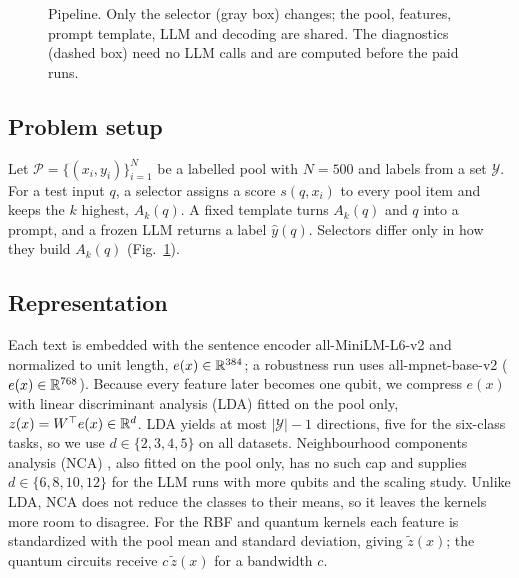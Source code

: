 \begin{figure}[t]
\centering
\resizebox{\textwidth}{!}{}
\caption{Pipeline. Only the selector (gray box) changes; the pool, features, prompt template, LLM and
decoding are shared. The diagnostics (dashed box) need no LLM calls and are computed before the paid
runs.}
\label{fig:pipeline}
\end{figure}

\subsection{Problem setup}
Let $\mathcal{P}=\{(x_i,y_i)\}_{i=1}^{N}$ be a labelled pool with $N=500$ and labels from a set
$\mathcal{Y}$. For a test input $q$, a selector assigns a score $s(q,x_i)$ to every pool item and keeps
the $k$ highest, $A_k(q)$. A fixed template turns $A_k(q)$ and $q$ into a prompt, and a frozen LLM
returns a label $\hat y(q)$. Selectors differ only in how they build $A_k(q)$ (Fig.~\ref{fig:pipeline}).

\subsection{Representation}
Each text is embedded with the sentence encoder all-MiniLM-L6-v2 \cite{reimers2019sentence,wang2020minilm}
and normalized to unit length, $e(x)\in\mathbb{R}^{384}$; a robustness run uses all-mpnet-base-v2
\cite{song2020mpnet} ($e(x)\in\mathbb{R}^{768}$). Because every feature later becomes one qubit, we compress
$e(x)$ with linear discriminant analysis (LDA) \cite{fisher1936use} fitted on the pool only,
$z(x)=W^\top e(x)\in\mathbb{R}^{d}$. LDA yields at most $|\mathcal{Y}|-1$ directions, five for the six-class tasks,
so we use $d\in\{2,3,4,5\}$ on all datasets. Neighbourhood components analysis (NCA)
\cite{goldberger2004nca}, also fitted on the pool only, has no such cap and supplies $d\in\{6,8,10,12\}$
for the LLM runs with more qubits and the scaling study. Unlike LDA, NCA does not reduce the classes to
their means, so it leaves the kernels more room to disagree. For the RBF and quantum kernels each
feature is standardized with the pool mean and standard deviation, giving $\tilde z(x)$; the quantum
circuits receive $c\,\tilde z(x)$ for a bandwidth $c$.

